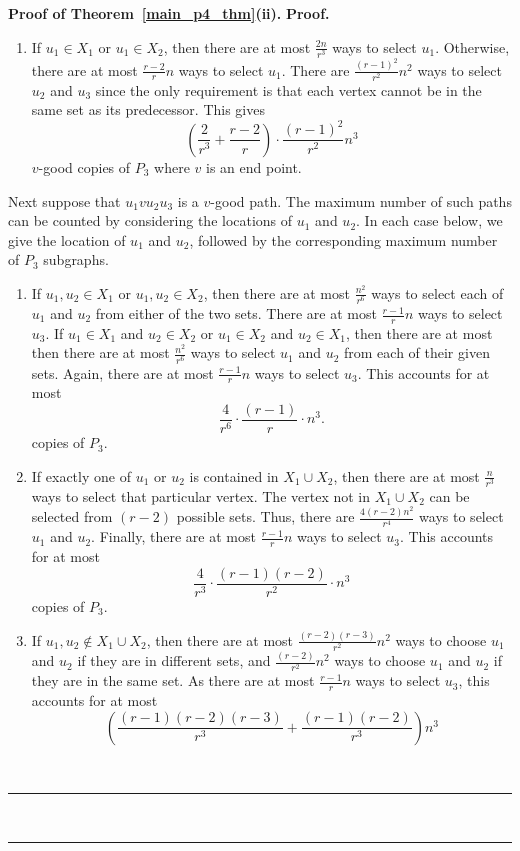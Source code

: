 \documentclass[12pt]{article}
\renewenvironment{proof}[1][Proof]{\textbf{#1.} }{\ \rule{0.5em}{0.5em}}
\begin{document}
\begin{proof}[Proof of Theorem~\ref{main_p4_thm}(ii)]
\begin{proof}
\begin{enumerate}
    \item If $u_1 \in X_1$ or $u_1 \in X_2$, then there are at most $\frac{2n}{r^3}$ ways to select $u_1$. Otherwise, there are at most $\frac{r-2}{r}n$ ways to select $u_1$. There are $\frac{(r-1)^2}{r^2}n^2$ ways to select $u_2$ and $u_3$ since the only requirement is that each vertex cannot be in the same set as its predecessor. This gives
    \[ \left(\frac{2}{r^3} + \frac{r-2}{r} \right) \cdot  \frac{(r-1)^2}{r^2}n^3 \]
    $v$-good copies of $P_3$ where $v$ is an end point.
\end{enumerate}

Next suppose that $u_1vu_2u_3$ is a $v$-good path. The maximum number of such paths can be counted by considering the locations of $u_1$ and $u_2$. In each case below, we give the location of $u_1$ and $u_2$, followed by the corresponding maximum number of $P_3$ subgraphs. 
\begin{enumerate}
    \item If $u_1,u_2 \in X_1$ or $u_1,u_2 \in X_2$, then there are at most $\frac{n^2}{r^6}$ ways to select each of $u_1$ and $u_2$ from either of the two sets. There are at most $\frac{r-1}{r}n$ ways to select $u_3$. If $u_1 \in X_1$ and $u_2 \in X_2$ or $u_1 \in X_2$ and $u_2 \in X_1$, then there are at most then there are at most $\frac{n^2}{r^6}$ ways to select $u_1$ and $u_2$ from each of their given sets. Again, there are at most $\frac{r-1}{r}n$ ways to select $u_3$. This accounts for at most
    \[ 
    \frac{4}{r^{6}}\cdot \frac{(r-1)}{r} \cdot n^3.
    \]
    copies of $P_3$.
    \item If exactly one of $u_1$ or $u_2$ is contained in $X_1 \cup X_2$, then there are at most $\frac{n}{r^3}$ ways to select that particular vertex. The vertex not in $X_1 \cup X_2$ can be selected from $(r-2)$ possible sets. Thus, there are $\frac{4(r-2)n^2}{r^4}$ ways to select $u_1$ and $u_2$. Finally, there are at most $\frac{r-1}{r}n$ ways to select $u_3$. This accounts for at most 
    \[ 
    \frac{4}{r^3}\cdot \frac{(r-1)(r-2)}{r^2} \cdot n^3 
    \]
    copies of $P_3$.
    \item If $u_1,u_2 \notin X_1 \cup X_2$, then there are at most $\frac{(r-2)(r-3)}{r^2}n^2$ ways to choose $u_1$ and $u_2$ if they are in different sets, and $\frac{(r-2)}{r^2}n^2$ ways to choose $u_1$ and $u_2$ if they are in the same set. As there are at most $\frac{r-1}{r}n$ ways to select $u_3$, this accounts for at most 
    \[ 
    \left( \frac{(r-1)(r-2)(r-3)}{r^3} + \frac{(r-1)(r-2)}{r^3} \right)n^3 
\]
\end{enumerate}
\end{proof}
\end{proof}
\end{document}
